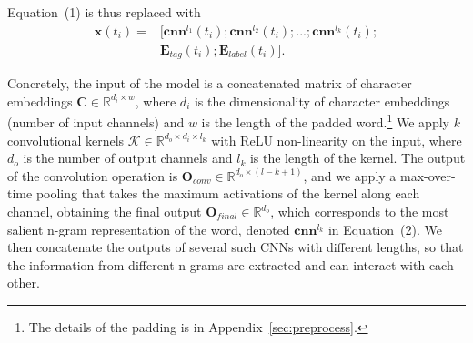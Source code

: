 \documentclass[11pt,a4paper]{article}
\begin{document}
    Equation~(1) is thus replaced with
    \begin{align*}
    \mathbf{x}(t_i) = & [\mathbf{cnn}^{l_1}(t_i); \mathbf{cnn}^{l_2}(t_i); ...; \mathbf{cnn}^{l_k}(t_i); \\
           & \mathbf{E}_{tag}(t_i); \mathbf{E}_{label}(t_i)] .\tag{2}
    \end{align*} 
    
    Concretely, the input of the model is a concatenated matrix of character embeddings $\mathbf{C} \in \mathbb{R}^{d_i \times w}$, where $d_i$ is the dimensionality of character embeddings (number of input channels) and $w$ is the length of the padded word.\footnote{The details of the padding is in Appendix~\ref{sec:preprocess}.} 
    We apply $k$ convolutional kernels $\mathcal{K} \in \mathbb{R}^{d_o \times d_i \times l_k}$ with ReLU non-linearity on the input, where $d_o$ is the number of output channels and $l_k$ is the length of the kernel.
    The output of the convolution operation is $\mathbf{O}_{conv} \in \mathbb{R}^{d_o \times (l-k+1)}$, and we apply a max-over-time pooling that takes the maximum activations of the kernel along each channel, obtaining the final output $\mathbf{O}_{final} \in \mathbb{R}^{d_o}$, which corresponds to the most salient n-gram representation of the word, denoted $\mathbf{cnn}^{l_k}$ in Equation~(2). 
    We then concatenate the outputs of several such CNNs with different lengths, so that the information from different n-grams are extracted and can interact with each other. 





\end{document}
